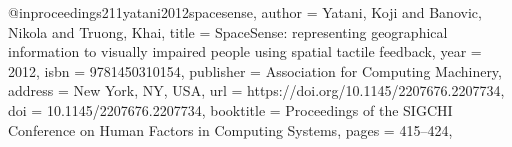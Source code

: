 @inproceedings{211yatani2012spacesense,
author = {Yatani, Koji and Banovic, Nikola and Truong, Khai},
title = {SpaceSense: representing geographical information to visually impaired people using spatial tactile feedback},
year = {2012},
isbn = {9781450310154},
publisher = {Association for Computing Machinery},
address = {New York, NY, USA},
url = {https://doi.org/10.1145/2207676.2207734},
doi = {10.1145/2207676.2207734},
booktitle = {Proceedings of the SIGCHI Conference on Human Factors in Computing Systems},
pages = {415–424},
}